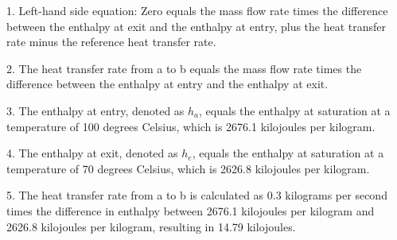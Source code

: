 1. Left-hand side equation:
Zero equals the mass flow rate times the difference between the enthalpy at exit and the enthalpy at entry, plus the heat transfer rate minus the reference heat transfer rate.

2. The heat transfer rate from a to b equals the mass flow rate times the difference between the enthalpy at entry and the enthalpy at exit.

3. The enthalpy at entry, denoted as \( h_a \), equals the enthalpy at saturation at a temperature of 100 degrees Celsius, which is 2676.1 kilojoules per kilogram.

4. The enthalpy at exit, denoted as \( h_e \), equals the enthalpy at saturation at a temperature of 70 degrees Celsius, which is 2626.8 kilojoules per kilogram.

5. The heat transfer rate from a to b is calculated as 0.3 kilograms per second times the difference in enthalpy between 2676.1 kilojoules per kilogram and 2626.8 kilojoules per kilogram, resulting in 14.79 kilojoules.